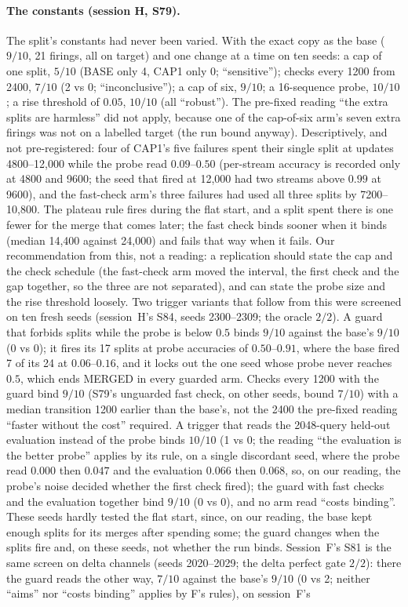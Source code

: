 \documentclass[11pt]{article}
\begin{document}
\paragraph{The constants (session H, S79).} The split's constants had never been varied. With the exact copy as the base ($9/10$, 21 firings, all on target) and one change at a time on ten seeds: a cap of one split, $5/10$ (BASE only 4, CAP1 only 0; ``sensitive''); checks every 1200 from 2400, $7/10$ (2 vs 0; ``inconclusive''); a cap of six, $9/10$; a 16-sequence probe, $10/10$; a rise threshold of $0.05$, $10/10$ (all ``robust''). The pre-fixed reading ``the extra splits are harmless'' did not apply, because one of the cap-of-six arm's seven extra firings was not on a labelled target (the run bound anyway). Descriptively, and not pre-registered: four of CAP1's five failures spent their single split at updates 4800--12{,}000 while the probe read $0.09$--$0.50$ (per-stream accuracy is recorded only at 4800 and 9600; the seed that fired at 12{,}000 had two streams above $0.99$ at 9600), and the fast-check arm's three failures had used all three splits by 7200--10{,}800. The plateau rule fires during the flat start, and a split spent there is one fewer for the merge that comes later; the fast check binds sooner when it binds (median 14{,}400 against 24{,}000) and fails that way when it fails. Our recommendation from this, not a reading: a replication should state the cap and the check schedule (the fast-check arm moved the interval, the first check and the gap together, so the three are not separated), and can state the probe size and the rise threshold loosely. Two trigger variants that follow from this were screened on ten fresh seeds (session~H's S84, seeds 2300--2309; the oracle $2/2$). A guard that forbids splits while the probe is below $0.5$ binds $9/10$ against the base's $9/10$ (0 vs 0); it fires its 17 splits at probe accuracies of $0.50$--$0.91$, where the base fired 7 of its 24 at $0.06$--$0.16$, and it locks out the one seed whose probe never reaches $0.5$, which ends MERGED in every guarded arm. Checks every 1200 with the guard bind $9/10$ (S79's unguarded fast check, on other seeds, bound $7/10$) with a median transition 1200 earlier than the base's, not the 2400 the pre-fixed reading ``faster without the cost'' required. A trigger that reads the 2048-query held-out evaluation instead of the probe binds $10/10$ (1 vs 0; the reading ``the evaluation is the better probe'' applies by its rule, on a single discordant seed, where the probe read $0.000$ then $0.047$ and the evaluation $0.066$ then $0.068$, so, on our reading, the probe's noise decided whether the first check fired); the guard with fast checks and the evaluation together bind $9/10$ (0 vs 0), and no arm read ``costs binding''. These seeds hardly tested the flat start, since, on our reading, the base kept enough splits for its merges after spending some; the guard changes when the splits fire and, on these seeds, not whether the run binds. Session~F's S81 is the same screen on delta channels (seeds 2020--2029; the delta perfect gate $2/2$): there the guard reads the other way, $7/10$ against the base's $9/10$ (0 vs 2; neither ``aims'' nor ``costs binding'' applies by F's rules), on session~F's 
\end{document}
